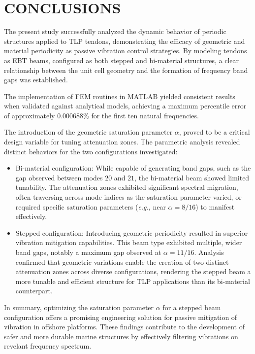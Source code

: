 \section{CONCLUSIONS}

The present study successfully analyzed the dynamic behavior of periodic structures applied to TLP tendons, demonstrating the efficacy of geometric and material periodicity as passive vibration control strategies. By modeling tendons as EBT beams, configured as both stepped and bi-material structures, a clear relationship between the unit cell geometry and the formation of frequency band gaps was established.

The implementation of FEM routines in MATLAB yielded consistent results when validated against analytical models, achieving a maximum percentile error of approximately 0.000688\% for the first ten natural frequencies.

The introduction of the geometric saturation parameter $\alpha$, proved to be a critical design variable for tuning attenuation zones. The parametric analysis revealed distinct behaviors for the two configurations investigated:

\begin{itemize}
    \item Bi-material configuration: While capable of generating band gaps, such as the gap observed between modes $20$ and $21$, the bi-material beam showed limited tunability. The attenuation zones exhibited significant spectral migration, often traversing across mode indices as the saturation parameter varied, or required specific saturation parameters (\textit{e.g.}, near $\alpha=8/16$) to manifest effectively.
    \item Stepped configuration: Introducing geometric periodicity resulted in superior vibration mitigation capabilities. This beam type exhibited multiple, wider band gaps, notably a maximum gap observed at $\alpha=11/16$. Analysis confirmed that geometric variations enable the creation of two distinct attenuation zones across diverse configurations, rendering the stepped beam a more tunable and efficient structure for TLP applications than its bi-material counterpart.
\end{itemize}

In summary, optimizing the saturation parameter $\alpha$ for a stepped beam configuration offers a promising engineering solution for passive mitigation of vibration in offshore platforms. These findings contribute to the development of safer and more durable marine structures by effectively filtering vibrations on revelant frequency spectrum.
